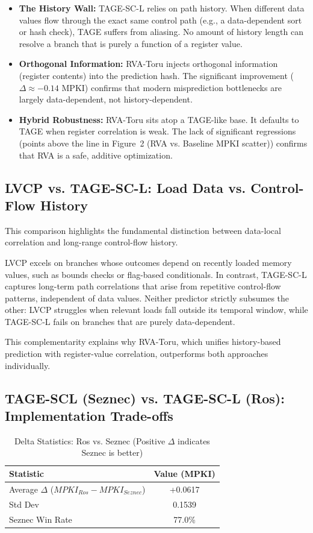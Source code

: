 \documentclass[11pt,a4paper]{article}
\begin{document}
\begin{itemize}
    \item \textbf{The History Wall:} TAGE-SC-L relies on path history. When different data values flow through the exact same control path (e.g., a data-dependent sort or hash check), TAGE suffers from aliasing. No amount of history length can resolve a branch that is purely a function of a register value.
    \item \textbf{Orthogonal Information:} RVA-Toru injects orthogonal information (register contents) into the prediction hash. The significant improvement ($\Delta \approx -0.14$ MPKI) confirms that modern misprediction bottlenecks are largely data-dependent, not history-dependent.
    \item \textbf{Hybrid Robustness:} RVA-Toru sits atop a TAGE-like base. It defaults to TAGE when register correlation is weak. The lack of significant regressions (points above the line in Figure~2 (RVA vs. Baseline MPKI scatter)) confirms that RVA is a safe, additive optimization.
\end{itemize}
\subsection{LVCP vs. TAGE-SC-L: Load Data vs. Control-Flow History}

This comparison highlights the fundamental distinction between data-local correlation and long-range control-flow history.

LVCP excels on branches whose outcomes depend on recently loaded memory values, such as bounds checks or flag-based conditionals. In contrast, TAGE-SC-L captures long-term path correlations that arise from repetitive control-flow patterns, independent of data values. Neither predictor strictly subsumes the other: LVCP struggles when relevant loads fall outside its temporal window, while TAGE-SC-L fails on branches that are purely data-dependent.

This complementarity explains why RVA-Toru, which unifies history-based prediction with register-value correlation, outperforms both approaches individually.

\subsection{TAGE-SCL (Seznec) vs. TAGE-SC-L (Ros): Implementation Trade-offs}

\begin{table}[h!]
\centering
\begin{tabular}{|l|c|}
\hline
\textbf{Statistic} & \textbf{Value (MPKI)} \\
\hline
Average $\Delta$ ($MPKI_{Ros} - MPKI_{Seznec}$) & +0.0617 \\
Std Dev & 0.1539 \\
Seznec Win Rate & 77.0\% \\
\hline
\end{tabular}
\caption{Delta Statistics: Ros vs. Seznec (Positive $\Delta$ indicates Seznec is better)}
\end{table}
\end{document}

